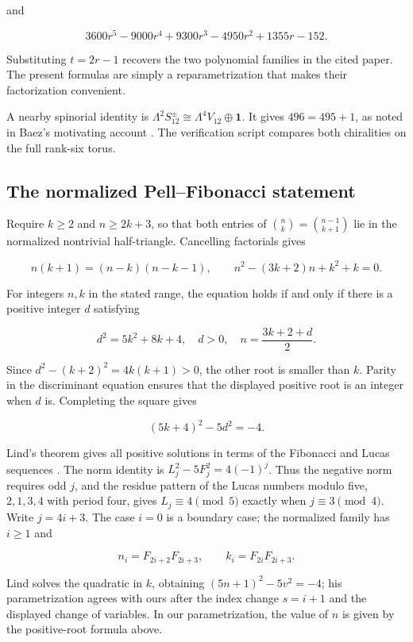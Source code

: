 \documentclass[11pt,a4paper]{article}
\begin{document}
and

\[
3600r^5-9000r^4+9300r^3-4950r^2+1355r-152.
\]

Substituting \(t=2r-1\) recovers the two polynomial families in the cited paper. The present formulas are simply a reparametrization that makes their factorization convenient.

A nearby spinorial identity is \(\Lambda^2S_{12}^{\pm}\cong\Lambda^4V_{12}\oplus\mathbf1\). It gives \(496=495+1\), as noted in Baez's motivating account \citep{Baez2026Coincidences}. The verification script compares both chiralities on the full rank-six torus.

\subsection{The normalized Pell–Fibonacci statement}\label{subsec:E3}

Require \(k\ge2\) and \(n\ge2k+3\), so that both entries of \(\binom nk=\binom{n-1}{k+1}\) lie in the normalized nontrivial half-triangle. Cancelling factorials gives

\[
n(k+1)=(n-k)(n-k-1),\qquad
n^2-(3k+2)n+k^2+k=0.
\]

For integers \(n,k\) in the stated range, the equation holds if and only if there is a positive integer \(d\) satisfying

\[
d^2=5k^2+8k+4,\quad d>0,\quad
n=\frac{3k+2+d}{2}.
\]

Since \(d^2-(k+2)^2=4k(k+1)>0\), the other root is smaller than \(k\). Parity in the discriminant equation ensures that the displayed positive root is an integer when \(d\) is. Completing the square gives

\[
(5k+4)^2-5d^2=-4.
\]

Lind's theorem gives all positive solutions in terms of the Fibonacci and Lucas sequences \citep[Theorem 7 and Section 5]{Lind1968}. The norm identity is \(L_j^2-5F_j^2=4(-1)^j\). Thus the negative norm requires odd \(j\), and the residue pattern of the Lucas numbers modulo five, \(2,1,3,4\) with period four, gives \(L_j\equiv4\pmod5\) exactly when \(j\equiv3\pmod4\). Write \(j=4i+3\). The case \(i=0\) is a boundary case; the normalized family has \(i\ge1\) and

\[
n_i=F_{2i+2}F_{2i+3},\qquad
k_i=F_{2i}F_{2i+3}.
\]

Lind solves the quadratic in \(k\), obtaining \((5n+1)^2-5v^2=-4\); his parametrization agrees with ours after the index change \(s=i+1\) and the displayed change of variables. In our parametrization, the value of \(n\) is given by the positive-root formula above.
\end{document}
